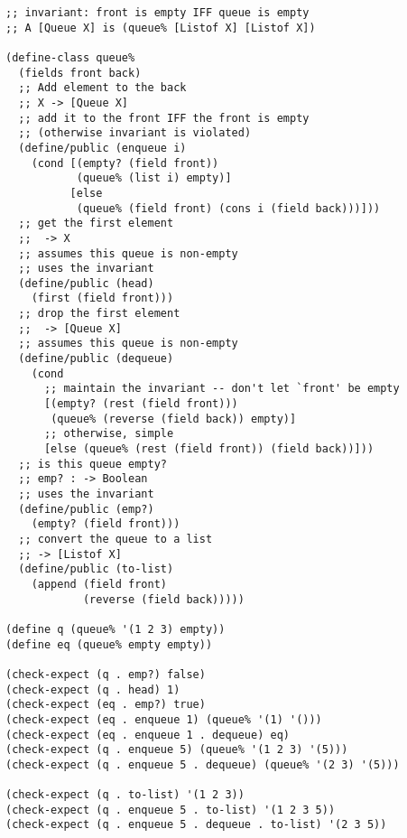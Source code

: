 \documentclass[12pt]{article}                   %
\newenvironment{solution}{}{}
\begin{document}
\begin{problem}
\begin{solution}
\begin{verbatim}
;; invariant: front is empty IFF queue is empty
;; A [Queue X] is (queue% [Listof X] [Listof X])

(define-class queue%
  (fields front back)
  ;; Add element to the back
  ;; X -> [Queue X]
  ;; add it to the front IFF the front is empty
  ;; (otherwise invariant is violated)
  (define/public (enqueue i)
    (cond [(empty? (field front))
           (queue% (list i) empty)]
          [else
           (queue% (field front) (cons i (field back)))]))
  ;; get the first element
  ;;  -> X
  ;; assumes this queue is non-empty
  ;; uses the invariant
  (define/public (head)
    (first (field front)))
  ;; drop the first element
  ;;  -> [Queue X]
  ;; assumes this queue is non-empty
  (define/public (dequeue)
    (cond 
      ;; maintain the invariant -- don't let `front' be empty
      [(empty? (rest (field front)))
       (queue% (reverse (field back)) empty)]
      ;; otherwise, simple
      [else (queue% (rest (field front)) (field back))]))
  ;; is this queue empty?
  ;; emp? : -> Boolean
  ;; uses the invariant
  (define/public (emp?)
    (empty? (field front)))
  ;; convert the queue to a list
  ;; -> [Listof X] 
  (define/public (to-list)
    (append (field front)
            (reverse (field back)))))

(define q (queue% '(1 2 3) empty))
(define eq (queue% empty empty))

(check-expect (q . emp?) false)
(check-expect (q . head) 1)
(check-expect (eq . emp?) true)
(check-expect (eq . enqueue 1) (queue% '(1) '()))
(check-expect (eq . enqueue 1 . dequeue) eq)
(check-expect (q . enqueue 5) (queue% '(1 2 3) '(5)))
(check-expect (q . enqueue 5 . dequeue) (queue% '(2 3) '(5)))

(check-expect (q . to-list) '(1 2 3))
(check-expect (q . enqueue 5 . to-list) '(1 2 3 5))
(check-expect (q . enqueue 5 . dequeue . to-list) '(2 3 5))
\end{verbatim}
\end{solution}
\end{problem}

\newpage
\ifrubric{}
\newpage
\fi
\end{document}

